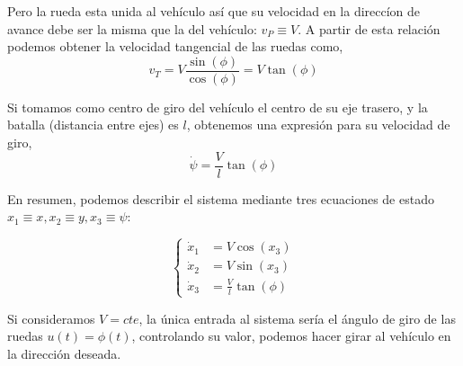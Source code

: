 Pero la rueda esta unida al vehículo así que su velocidad en la direccíon de avance debe ser la misma que la del vehículo: $v_P \equiv V$.  A partir de esta relación podemos obtener la velocidad tangencial de las ruedas como,
\begin{equation}
v_T = V\frac{\sin(\phi)}{\cos(\phi)} = V\tan(\phi)
\end{equation}

Si tomamos como centro de giro del vehículo el centro de su eje trasero, y la batalla (distancia entre ejes) es $l$, obtenemos una expresión para su velocidad de giro,
\begin{equation}
\dot{\psi} = \frac{V}{l}\tan(\phi)
\end{equation}

En resumen, podemos describir el sistema mediante tres ecuaciones de estado $x_1 \equiv x, x_2\equiv	y, x_3 \equiv \psi$:


\begin{equation}
	\begin{cases}
		\dot x_1 &=  V\cos(x_3)\\  
		\dot x_2 &=  V\sin(x_3)\\
		\dot x_3 &= \frac{V}{l}\tan(\phi)
	\end{cases}
\end{equation}

Si consideramos $V=cte$, la única entrada al sistema sería el ángulo de giro de las ruedas $u(t) = \phi(t)$, controlando su valor, podemos hacer girar al vehículo en la dirección deseada. 

